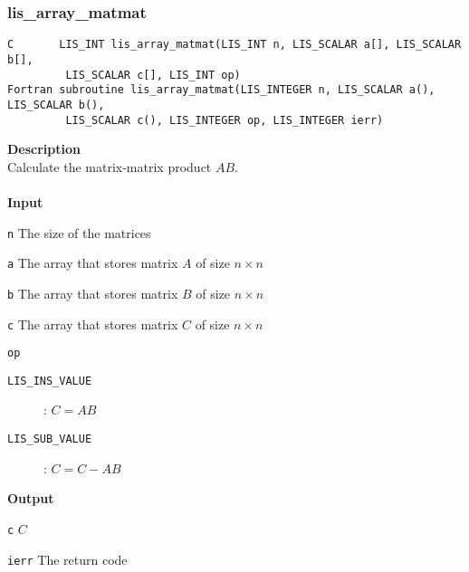 \documentclass[a4paper]{article}
\newcommand{\namelistlabel}[1]{\mbox{#1}\hfill}
\newenvironment{namelist}[1]{%
\begin{list}{}
  {\let\makelabel\namelistlabel
  \settowidth{\labelwidth}{#1}
  \setlength{\leftmargin}{1.1\labelwidth}}
  }{%
\end{list}}
\begin{document}
\subsubsection{lis\_array\_matmat}
\begin{screen}
\verb|C       LIS_INT lis_array_matmat(LIS_INT n, LIS_SCALAR a[], LIS_SCALAR b[],|\\
\verb|         LIS_SCALAR c[], LIS_INT op)|\\
\verb|Fortran subroutine lis_array_matmat(LIS_INTEGER n, LIS_SCALAR a(), LIS_SCALAR b(),|\\
\verb|         LIS_SCALAR c(), LIS_INTEGER op, LIS_INTEGER ierr)|
\end{screen}
{\bf Description}\\
\indent
Calculate the matrix-matrix product $AB$.
\\ \\
\noindent
{\bf Input}
\begin{namelist}{XXXXXXXXXXXXXXXXXXXX}
\item[\tt n] The size of the matrices
\item[\tt a] The array that stores matrix $A$ of size $n \times n$
\item[\tt b] The array that stores matrix $B$ of size $n \times n$
\item[\tt c] The array that stores matrix $C$ of size $n \times n$
\item[\tt op] \begin{description}
\item[\tt LIS\_INS\_VALUE]: $C = AB$
\item[\tt LIS\_SUB\_VALUE]: $C = C - AB$
\end{description}
\end{namelist}
{\bf Output}
\begin{namelist}{XXXXXXXXXXXXXXXXXXXX}
\item[\tt c] $C$
\item[\tt ierr] The return code
\end{namelist}

\newpage
\end{document}
